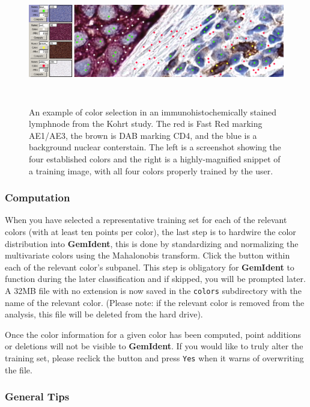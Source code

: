 \documentclass[12pt]{article}
\begin{document}
\begin{figure}[htp]
\centering
\includegraphics[width=476pt,height=135pt]{colorexamples.jpg}
\label{fig:colorexamples}
\caption{\sf An example of color selection in an immunohistochemically stained lymphnode from the Kohrt study\cite{kohrt}. The red is Fast Red marking AE1/AE3, the brown is DAB marking CD4, and the blue is a background nuclear conterstain. The left is a screenshot showing the four established colors and the right is a highly-magnified snippet of a training image, with all four colors properly trained by the user.}
\end{figure}

\subsubsection{Computation}

When you have selected a representative training set for each of the relevant colors (with at least ten points per color), the last step is to hardwire the color distribution into {\bf GemIdent}, this is done by standardizing and normalizing the multivariate colors using the Mahalonobis transform. Click the button within each of the relevant color's subpanel. This step is obligatory for {\bf GemIdent} to function during the later classification and if skipped, you will be prompted later. A 32MB file with no extension is now saved in the {\tt colors} subdirectory with the name of the relevant color. (Please note: if the relevant color is removed from the analysis, this file will be deleted from the hard drive).

Once the color information for a given color has been computed, point additions or deletions will not be visible to {\bf GemIdent}. If you would like to truly alter the training set, please reclick the  button and press {\tt Yes} when it warns of overwriting the file.

\subsubsection{General Tips}
\end{document}
